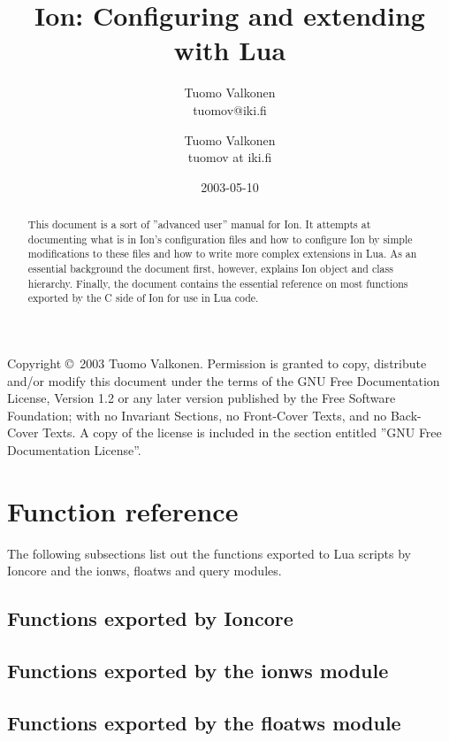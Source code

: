 \documentclass[english,a4paper,11pt,oldtoc,mctitle]{rapport3}
\title{Ion: Configuring and extending with Lua}
\author{Tuomo Valkonen \\ tuomov@iki.fi}
\author{Tuomo Valkonen \\ tuomov at iki.fi}
\date{2003-05-10}
\begin{document}
\maketitle

Copyright \copyright\  2003 Tuomo Valkonen.
Permission is granted to copy, distribute and/or modify this document
under the terms of the GNU Free Documentation License, Version 1.2
or any later version published by the Free Software Foundation;
with no Invariant Sections, no Front-Cover Texts, and no Back-Cover Texts.
A copy of the license is included in the section entitled ''GNU
Free Documentation License''.

\begin{abstract}
    This document is a sort of ''advanced user'' manual for Ion. It
    attempts at documenting what is in Ion's configuration files and
    how to configure Ion by simple modifications to these files and
    how to write more complex extensions in Lua. As an essential 
    background the document first, however, explains Ion object and
    class hierarchy. Finally, the document contains the essential
    reference on most functions exported by the C side of Ion for use
    in Lua code.
\end{abstract}

\tableofcontents





\chapter{Function reference}
\label{sec:exports}

The following subsections list out the functions exported to Lua scripts
by Ioncore and the ionws, floatws and query modules.

\section{Functions exported by Ioncore}
\label{sec:ioncoreref}



\section{Functions exported by the ionws module}
\label{sec:ionwsref}



\section{Functions exported by the floatws module}
\label{sec:floatwsref}
\end{document}
